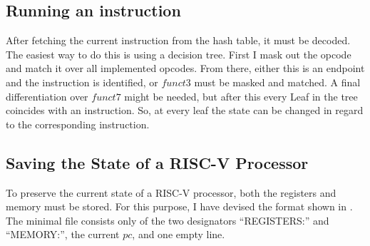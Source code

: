 

\subsection{Running an instruction}
After fetching the current instruction from the hash table, it must
be decoded. The easiest way to do this is using a decision tree. First I mask out the opcode and match it over all implemented opcodes.
From there, either this is an endpoint and the instruction is identified, or $funct3$ must be masked and matched. A final differentiation over $funct7$ might be needed,
but after this every Leaf in the tree coincides with an instruction. So, at every leaf the state can be changed in regard to the corresponding instruction.

\subsection{Saving the State of a RISC-V
      Processor}\label{sub:statefile}

To preserve the current state of a RISC-V processor, both the
registers and memory must be stored. For this purpose, I have devised
the format shown in . The minimal file consists
only of the two designators \enquote{REGISTERS:} and
\enquote{MEMORY:}, the current $pc$, and one empty line.

